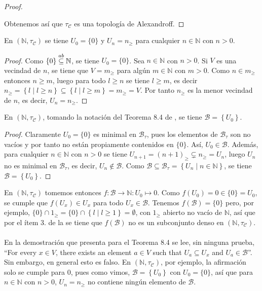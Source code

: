 {\begin{proof}
\begin{itemize}
   \end{itemize}
   Obtenemos así que $\tau_{\mathcal{C}}$ es una topología de Alexandroff.
\end{proof}
\begin{Prop}
   En $(\mathbb{N},\tau_{\mathcal{C}})$ se tiene $U_0=\{0\}$ y $U_n=n_{\ge}$ para cualquier $n\in\mathbb{N}$ con $n>0$.
\end{Prop}
\begin{proof}
   Como $\{0\}\stackrel{ab}{\subseteq}\mathbb{N}$, se tiene $U_0=\{0\}$. Sea $n\in\mathbb{N}$ con $n>0$. Si $V$ es una vecindad de $n$, se tiene que $V=m_{\ge}$ para algún $m\in\mathbb{N}$ con $m>0$. Como $n\in m_{\ge}$ entonces $n\ge m$, luego para todo $l\ge n$ se tiene $l\ge m$, es decir $n_{\ge}=\left\lbrace l\mid l\ge n\right\rbrace\subseteq\left\lbrace l\mid l\ge m\right\rbrace=m_{\ge}=V$. Por tanto $n_{\ge}$ es la menor vecindad de $n$, es decir, $U_n=n_{\ge}$.
\end{proof}
\begin{Prop}
   En $(\mathbb{N},\tau_{\mathcal{C}})$, tomando la notación del Teorema 8.4 de \cite{jafarian2013}, se tiene $\mathcal{B}=\left\lbrace U_0\right\rbrace$.
\end{Prop}
\begin{proof}
   Claramente $U_0=\{0\}$ es minimal en $\mathcal{B}_\tau$, pues los elementos de $\mathcal{B}_\tau$ son no vacíos y por tanto no están propiamente contenidos en $\{0\}$. Así, $U_0\in\mathcal{B}$. Además, para cualquier $n\in\mathbb{N}$ con $n>0$ se tiene $U_{n+1}=(n+1)_{\ge}\subsetneq n_{\ge}=U_n$, luego $U_n$ no es minimal en $\mathcal{B}_\tau$, es decir, $U_n\notin\mathcal{B}$. Como $\mathcal{B}\subseteq\mathcal{B}_\tau=\left\lbrace U_n\mid n\in\mathbb{N}\right\rbrace$, se tiene $\mathcal{B}=\left\lbrace U_0\right\rbrace$.
\end{proof}
En $(\mathbb{N},\tau_{\mathcal{C}})$ tomemos entonces $f:\mathcal{B}\to\mathbb{N}:U_0\mapsto 0$. Como $f(U_0)=0\in\{0\}=U_0$, se cumple que $f(U_x)\in U_x$ para todo $U_x\in\mathcal{B}$. Tenemos $f(\mathcal{B})=\{0\}$ pero, por ejemplo, $\{0\}\cap 1_{\ge}=\{0\}\cap\left\lbrace l\mid l\ge 1\right\rbrace=\emptyset$, con $1_{\ge}$ abierto no vacío de $\mathbb{N}$, así que por el ítem 3. de la  se tiene que $f(\mathcal{B})$ no es un subconjunto denso en $(\mathbb{N},\tau_{\mathcal{C}})$.\\\\
En la demostración que presenta \cite{jafarian2013} para el Teorema 8.4 se lee, sin ninguna prueba, ``For every $x\in V$, there exists an element $a\in V$ such that $U_a\subseteq U_x$ and $U_a\in\mathcal{B}$''. Sin embargo, en general esto es falso. En $(\mathbb{N},\tau_{\mathcal{C}})$, por ejemplo, la afirmación solo se cumple para $0$, pues como vimos, $\mathcal{B}=\left\lbrace U_0\right\rbrace$ con $U_0=\{0\}$, así que para $n\in\mathbb{N}$ con $n>0$, $U_n=n_{\ge}$ no contiene ningún elemento de $\mathcal{B}$.
}

